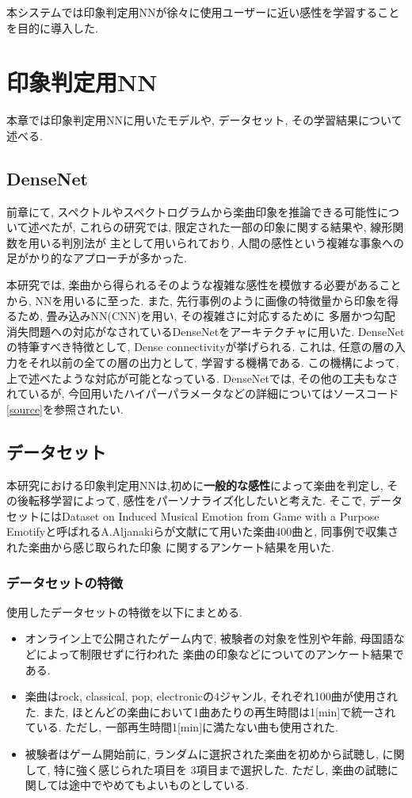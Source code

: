\documentclass[a4paper,11pt,dvipdfmx]{jreport}
\begin{document}
本システムでは印象判定用NNが徐々に使用ユーザーに近い感性を学習することを目的に導入した.

\chapter{印象判定用NN}
本章では印象判定用NNに用いたモデルや, データセット, その学習結果について述べる.
\section{DenseNet}
前章にて, スペクトルやスペクトログラムから楽曲印象を推論できる可能性について述べたが, 
これらの研究\cite{Nagoya,Tokyo, Matsue}では, 限定された一部の印象に関する結果や, 線形関数を用いる判別法が
主として用いられており, 人間の感性という複雑な事象への足がかり的なアプローチが多かった.

本研究では, 楽曲から得られるそのような複雑な感性を模倣する必要があることから, NNを用いるに至った.
また, 先行事例のように画像の特徴量から印象を得るため, 畳み込みNN(CNN)を用い, その複雑さに対応するために
多層かつ勾配消失問題への対応がなされているDenseNet\cite{Dense}をアーキテクチャに用いた. 
DenseNetの特筆すべき特徴として, Dense connectivityが挙げられる.
これは, 任意の層の入力をそれ以前の全ての層の出力として, 学習する機構である.
この機構によって, 上で述べたような対応が可能となっている.
DenseNetでは, その他の工夫もなされているが, 今回用いたハイパーパラメータなどの詳細についてはソースコード\ref{source}を参照されたい.
\section{データセット}
本研究における印象判定用NNは,初めに\textbf{一般的な感性}によって楽曲を判定し, その後転移学習によって, 感性をパーソナライズ化したいと考えた.
そこで, データセットにはDataset on Induced Musical Emotion from Game with a Purpose Emotifyと呼ばれるA.Aljanakiらが文献\cite{game}にて用いた楽曲400曲と, 同事例で収集された楽曲から感じ取られた印象
に関するアンケート結果を用いた.
\subsection{データセットの特徴}
\label{traindata}
使用したデータセットの特徴を以下にまとめる.
\begin{itemize}
  \item オンライン上で公開されたゲーム内で, 被験者の対象を性別や年齢, 母国語などによって制限せずに行われた 
        楽曲の印象などについてのアンケート結果である.
  \item 楽曲はrock, classical, pop, electronicの4ジャンル, それぞれ100曲が使用された.
        また, ほとんどの楽曲において1曲あたりの再生時間は1[min]で統一されている. ただし, 一部再生時間1[min]に満たない曲も使用された.
  \item 被験者はゲーム開始前に, ランダムに選択された楽曲を初めから試聴し, に関して, 特に強く感じられた項目を
        3項目まで選択した. ただし, 楽曲の試聴に関しては途中でやめてもよいものとしている.
\end{itemize}
\end{document}
